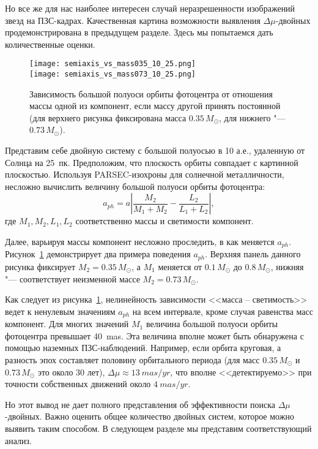 Но все же для нас наиболее интересен случай неразрешенности изображений звезд на ПЗС-кадрах. Качественная картина возможности выявления $\Delta\mu$-двойных продемонстрирована в предыдущем разделе. Здесь мы попытаемся дать количественные оценки.

\begin{figure}[pt]\label{fig:semiaxis1}
\centering
\texttt{[image: semiaxis\_vs\_mass035\_10\_25.png]}\\
\texttt{[image: semiaxis\_vs\_mass073\_10\_25.png]}
\caption{Зависимость большой полуоси орбиты фотоцентра от отношения массы одной из компонент, если массу другой принять постоянной (для верхнего рисунка фиксирована масса $0.35\,M_\odot$, для нижнего "--- $0.73\,M_\odot$).}
\end{figure}

Представим себе двойную систему с большой полуосью в 10 а.е., удаленную от Солнца на 25~пк. Предположим, что плоскость орбиты совпадает с картинной плоскостью. Используя PARSEC-изохроны для солнечной металличности, несложно вычислить величину большой полуоси орбиты фотоцентра:
\begin{equation}
\label{eq:Photocenter}
 a_{ph}=a\left| \frac{M_2}{M_1+M_2} - \frac{L_2}{L_1+L_2} \right|,
\end{equation}
где $M_1,M_2,L_1,L_2$ соответственно массы и светимости компонент.

Далее, варьируя массы компонент несложно проследить, в как меняется $a_{ph}$. Рисунок~\ref{fig:semiaxis1} демонстрирует два примера поведения $a_{ph}$. Верхняя панель данного рисунка фиксирует $M_2 = 0.35\,M_\odot$, а $M_1$ меняется от $0.1\,M_\odot$ до $0.8\,M_\odot$, нижняя "--- соответствует неизменной массе $M_2 = 0.73\,M_\odot$.

Как следует из рисунка~\ref{fig:semiaxis1}, нелинейность зависимости <<масса -- светимость>> ведет к ненулевым значениям $a_{ph}$ на всем интервале, кроме случая равенства масс компонент. Для многих значений $M_1$ величина большой полуоси орбиты фотоцентра превышает 40~mas. Эта величина вполне может быть обнаружена с помощью наземных ПЗС-наблюдений. Например, если орбита круговая, а разность эпох составляет половину орбитального периода (для масс  $0.35\,M_\odot$ и $0.73\,M_\odot$ это около 30 лет), $\Delta\mu\approx 13~mas/yr$, что вполне <<детектируемо>> при точности собственных движений около $4~mas/yr$.  

Но этот вывод не дает полного представления об эффективности поиска  $\Delta\mu$-двойных. Важно оценить общее количество двойных систем, которое можно выявить таким способом. В следующем разделе мы представим соответствующий анализ.

